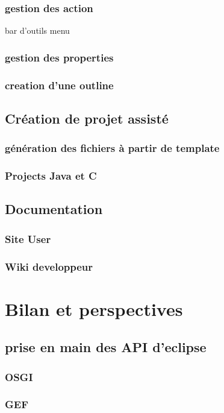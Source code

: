 \documentclass{article}
\begin{document}
        \subsubsection{gestion des action}
            bar d'outils
            menu
        \subsubsection{gestion des properties}
        \subsubsection{creation d'une outline}
    \subsection{Création de projet assisté}
        \subsubsection{génération des fichiers à partir de template}
        \subsubsection{Projects Java et C }
    \subsection{Documentation}
        \subsubsection{Site User}
        \subsubsection{Wiki developpeur}

\section{Bilan et perspectives}
    \subsection{prise en main des API d'eclipse}
        \subsubsection{OSGI}
        \subsubsection{GEF}
\end{document}
